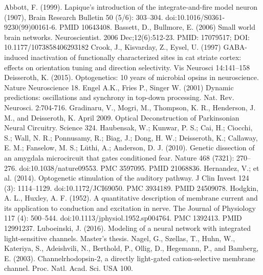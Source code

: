 \documentclass[14pt]{SelfArx} %
\numberwithin{equation}{section}
\begin{document}
\begin{thebibliography}{999}
 Abbott, F. (1999). Lapique's introduction of the integrate-and-fire model neuron (1907), Brain Research Bulletin 50 (5/6): 303–304. doi:10.1016/S0361-9230(99)00161-6. PMID 10643408.
 Bassett, D., Bullmore, E. (2006) Small world brain networks. Neuroscientist. 2006 Dec;12(6):512-23. PMID: 17079517; DOI: 10.1177/1073858406293182 
 Crook, J., Kisvarday, Z., Eysel, U. (1997) GABA-induced inactivation of functionally characterized sites in cat striate cortex: effects on orientation tuning and direction selectivity. Vis Neurosci 14:141–158
 Deisseroth, K. (2015). Optogenetics: 10 years of microbial opsins in neuroscience. Nature
Neuroscience 18.
 Engel A.K., Fries P., Singer W. (2001) Dynamic predictions: oscillations and synchrony in top-down processing. Nat. Rev. Neurosci. 2:704-716. 
 Gradinaru, V., Mogri, M., Thompson, K. R., Henderson, J. M., and Deisseroth, K.
April 2009. Optical Deconstruction of Parkinsonian Neural Circuitry. Science 324.
 Haubensak, W.; Kunwar, P. S.; Cai, H.; Ciocchi, S.; Wall, N. R.; Ponnusamy, R.; Biag, J.; Dong, H. W.; Deisseroth, K.; Callaway, E. M.; Fanselow, M. S.; Lüthi, A.; Anderson, D. J. (2010). Genetic dissection of an amygdala microcircuit that gates conditioned fear. Nature 468 (7321): 270–276. doi:10.1038/nature09553. PMC 3597095. PMID 21068836.
 Hernandez, V.; et al. (2014). Optogenetic stimulation of the auditory pathway. J Clin Invest 124 (3): 1114–1129. doi:10.1172/JCI69050. PMC 3934189. PMID 24509078.
 Hodgkin, A. L., Huxley, A. F. (1952). A quantitative description of membrane current and its application to conduction and excitation in nerve. The Journal of Physiology 117 (4): 500–544. doi:10.1113/jphysiol.1952.sp004764. PMC 1392413. PMID 12991237.
 Luboeinski, J. (2016). Modeling of a neural network with integrated light-sensitive channels. Master's thesis.
 Nagel, G., Szellas, T., Huhn, W., Kateriya, S., Adeishvili, N., Berthold, P., Ollig, D., Hegemann, P., and Bamberg, E. (2003). Channelrhodopsin-2, a directly light-gated cation-selective membrane channel. Proc. Natl. Acad. Sci. USA 100.

\end{thebibliography}
\end{document}
